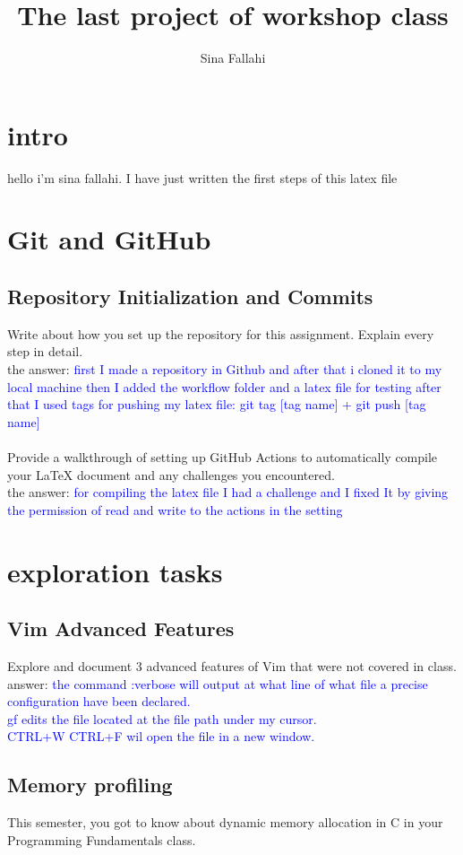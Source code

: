 \documentclass[titlepage]{article}
\title{The last project of workshop class}
\author{Sina Fallahi}
\begin{document}
\maketitle
\section{intro}
hello i'm sina fallahi. I have just written the first steps of this latex file

\section{Git and GitHub}

\subsection{Repository Initialization and Commits}
Write about how you set up the repository for this assignment. Explain every step in
detail.\\
the answer: \textcolor{blue}{first I made a repository in Github and after that i cloned it to my local machine then I added the workflow folder and a latex file for testing after that I used tags for pushing my latex file: git tag [tag name] + git push [tag name]}
\\ \\Provide a walkthrough of setting up GitHub Actions to automatically compile your LaTeX
document and any challenges you encountered.\\
the answer: \textcolor{blue}{for compiling the latex file I had a challenge and I fixed It by giving the permission of read and write to the actions in the setting}
\section{exploration tasks}
\subsection{Vim Advanced Features}
Explore and document 3 advanced features of Vim that were not covered in class.\\answer: \textcolor{blue}{the command :verbose will output at what line of what file a precise configuration have been declared.\\ gf edits the file located at the file path under my cursor.\\ CTRL+W CTRL+F wil open the file in a new window.}
\subsection{Memory profiling}
This semester, you got to know about dynamic memory allocation in C in your Programming Fundamentals class.
\end{document}
